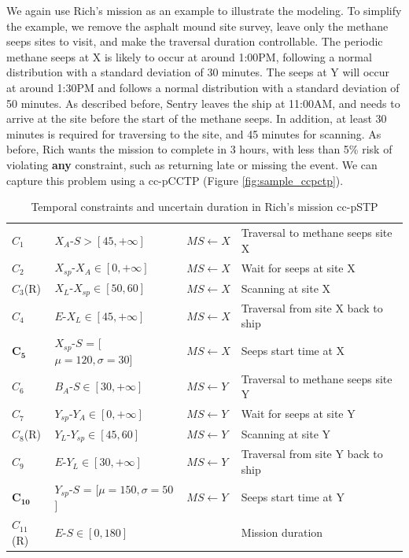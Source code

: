 \documentclass[jair,twoside,11pt,theapa]{article}
\begin{document}
We again use Rich's mission as an example to illustrate the modeling. To
simplify the example, we remove the asphalt mound site survey, leave only the methane seeps sites to visit, and make the traversal duration controllable. The
periodic methane seeps at X is likely to occur at around 1:00PM, following a normal distribution with
a standard deviation of 30 minutes. The seeps at Y will occur at around
1:30PM and follows a normal distribution with a standard deviation of 50
minutes. As described before, Sentry leaves the ship at 11:00AM, and needs to
arrive at the site before the start of the methane seeps. In addition, at least 30
minutes is required for traversing to the site, and 45 minutes for scanning. As
before, Rich wants the mission to complete in 3 hours, with less than 5\% risk
of violating \textbf{any} constraint, such as returning late or missing the event. We
can capture this problem using a cc-pCCTP (Figure \ref{fig:sample_ccpctp}).


\begin{table}[ht!]	
	\centering
	\caption{Temporal constraints and uncertain duration in Rich's mission cc-pSTP}
	\begin{tabular}{| m{1.5cm} m{4.5cm}  m{1.7cm} m{6.0cm}|}		
		\hline		
		$C_{1}$ & $X_A$-$S > [45,+\infty]$ & $MS \leftarrow X$ & Traversal to methane seeps site X\\
		$C_{2}$ & $X_{sp}$-$X_A\in[0,+\infty]$ & $MS \leftarrow X$ & Wait for seeps at site X \\
		$C_{3}$(R) & $X_L$-$X_{sp}\in[50,60]$ & $MS \leftarrow X$ & Scanning at site X \\ 
		$C_{4}$ & $E$-$X_L\in[45,+\infty]$ & $MS \leftarrow X$ & Traversal from site X back to ship \\
		$\mathbf{C_{5}}$ & $X_{sp}$-$S$ = [$\mu=120,\sigma=30$] & $MS \leftarrow X$ & Seeps start time at X \\
		$C_{6}$ & $B_A$-$S\in[30,+\infty]$ & $MS \leftarrow Y$ & Traversal to methane seeps site Y\\
		$C_{7}$ & $Y_{sp}$-$Y_A\in[0,+\infty]$ & $MS \leftarrow Y$ & Wait for seeps at site Y \\
		$C_{8}$(R) & $Y_L$-$Y_{sp}\in[45,60]$ & $MS \leftarrow Y$ & Scanning at site Y \\ 
		$C_{9}$ & $E$-$Y_L\in[30,+\infty]$ & $MS \leftarrow Y$ & Traversal from site Y back to ship \\
		$\mathbf{C_{10}}$ & $Y_{sp}$-$S$ = [$\mu=150,\sigma=50$] & $MS \leftarrow Y$ & Seeps start time at Y \\  
		$C_{11}$(R) & $E$-$S\in[0,180]$ & & Mission duration \\  
		\hline
	\end{tabular}
	\label{table:ccpctp_constraints}
\end{table}
\end{document}
